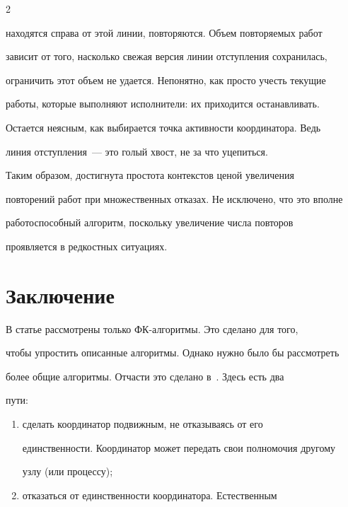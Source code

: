 \begin{multicols}{2}
\begin{enumerate}
находятся справа от этой линии, повторяются. Объем повторяемых работ 


зависит от того, насколько свежая версия линии отступления сохранилась, 


ограничить этот объем не удается. Непонятно, как просто учесть текущие 


работы, которые выполняют исполнители: их приходится останавливать. 


Остается неясным, как выбирается точка активности координатора. Ведь 


линия отступления~--- это голый хвост, не за что уцепиться.


\end{enumerate}





      Таким образом, достигнута простота контекстов ценой увеличения 


повторений работ при множественных отказах. Не исключено, что это вполне 


работоспособный алгоритм, поскольку увеличение числа повторов 


проявляется в редкостных си\-ту\-а\-циях.





\section{Заключение}


     


     В статье рассмотрены только ФК-ал\-го\-рит\-мы. Это сделано для того, 


чтобы упростить описанные алгоритмы. Однако нужно было бы рассмотреть 


более общие алгоритмы. Отчасти это сделано в~\cite{9-koz}. Здесь есть два 


пути:


     \begin{enumerate}[(1)]


\item сделать координатор подвижным, не отказываясь от его 


единственности. Координатор может передать свои полномочия другому 


узлу (или процессу);


\item отказаться от единственности координатора. Естественным 



\end{enumerate}
\end{multicols}
